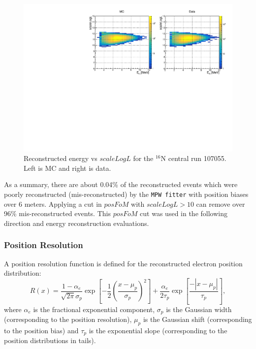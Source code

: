 \begin{figure}[!htb]
	\centering
	\includegraphics[width=13cm]{N16_107055_scaleLogLvsEnergy.pdf}
	\caption[Reconstructed energy vs $scaleLogL$ for the $^{16}$N central run 107055.]{Reconstructed energy vs $scaleLogL$ for the $^{16}$N central run 107055. Left is MC and right is data.}
	\label{energyVsFOM}
\end{figure}

As a summary, there are about 0.04\% of the reconstructed events which were poorly reconstructed (mis-reconstructed) by the \texttt{MPW fitter} with position biases over 6 meters. Applying a cut in $posFoM$ with $scaleLogL>10$ can remove over 96\% mis-reconstructed events. This $posFoM$ cut was used in the following direction and energy reconstruction evaluations.

\subsubsection{Position Resolution}
A position resolution function is defined for the reconstructed electron position distribution\cite{boulay2004direct}:
\begin{equation}
R(x)=\frac{1-\alpha_e}{\sqrt{2\pi}\sigma_p}\exp{[-\frac{1}{2}(\frac{x-\mu_p}{\sigma_p})^2]+\frac{\alpha_e}{2\tau_p}\exp{[\frac{-|x-\mu_p|}{\tau_p}]}},
\end{equation}
where $\alpha_e$ is the fractional exponential component, $\sigma_p$ is
the Gaussian width (corresponding to the position resolution), $\mu_p$ is the Gaussian shift (corresponding to the position bias) and $\tau_p$ is the exponential slope (corresponding to the position distributions in tails).

